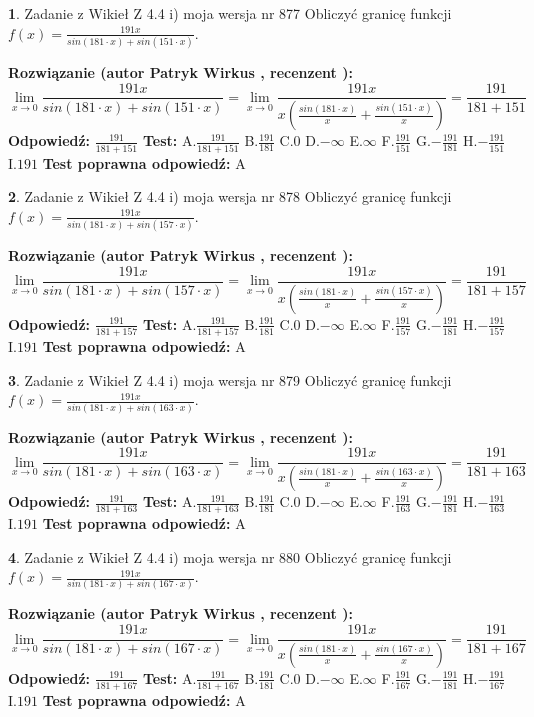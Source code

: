 \documentclass[12pt, a4paper]{article}
\theoremstyle{definition} %
\newtheorem{zad}{}
\newcommand{\zadStart}[1]{\begin{zad}#1\newline}
\newcommand{\zadStop}{\end{zad}}
\newcommand{\rozwStart}[2]{\noindent \textbf{Rozwiązanie (autor #1 , recenzent #2): }\newline}
\newcommand{\rozwStop}{\newline}
\newcommand{\odpStart}{\noindent \textbf{Odpowiedź:}\newline}
\newcommand{\odpStop}{\newline}
\newcommand{\testStart}{\noindent \textbf{Test:}\newline}
\newcommand{\testStop}{\newline}
\newcommand{\kluczStart}{\noindent \textbf{Test poprawna odpowiedź:}\newline}
\newcommand{\kluczStop}{\newline}
\begin{document}
\zadStart{Zadanie z Wikieł Z 4.4 i) moja wersja nr 877}
Obliczyć granicę funkcji $f(x)=\frac{191x}{sin(181\cdot x) +sin(151\cdot x)}$.
\zadStop
\rozwStart{Patryk Wirkus}{}
$$\lim\limits_{x\to 0}\frac{191x}{sin(181\cdot x) +sin(151\cdot x)}=\lim\limits_{x\to 0}\frac{191x}{x(\frac{sin(181\cdot x)}{x}+\frac{sin(151\cdot x)}{x})}=\frac{191}{181+151}$$
\rozwStop
\odpStart
$\frac{191}{181+151}$
\odpStop
\testStart
A.$\frac{191}{181+151}$
B.$\frac{191}{181}$
C.$0$
D.$-\infty$
E.$\infty$
F.$\frac{191}{151}$
G.$-\frac{191}{181}$
H.$-\frac{191}{151}$
I.$191$
\testStop
\kluczStart
A
\kluczStop



\zadStart{Zadanie z Wikieł Z 4.4 i) moja wersja nr 878}
Obliczyć granicę funkcji $f(x)=\frac{191x}{sin(181\cdot x) +sin(157\cdot x)}$.
\zadStop
\rozwStart{Patryk Wirkus}{}
$$\lim\limits_{x\to 0}\frac{191x}{sin(181\cdot x) +sin(157\cdot x)}=\lim\limits_{x\to 0}\frac{191x}{x(\frac{sin(181\cdot x)}{x}+\frac{sin(157\cdot x)}{x})}=\frac{191}{181+157}$$
\rozwStop
\odpStart
$\frac{191}{181+157}$
\odpStop
\testStart
A.$\frac{191}{181+157}$
B.$\frac{191}{181}$
C.$0$
D.$-\infty$
E.$\infty$
F.$\frac{191}{157}$
G.$-\frac{191}{181}$
H.$-\frac{191}{157}$
I.$191$
\testStop
\kluczStart
A
\kluczStop



\zadStart{Zadanie z Wikieł Z 4.4 i) moja wersja nr 879}
Obliczyć granicę funkcji $f(x)=\frac{191x}{sin(181\cdot x) +sin(163\cdot x)}$.
\zadStop
\rozwStart{Patryk Wirkus}{}
$$\lim\limits_{x\to 0}\frac{191x}{sin(181\cdot x) +sin(163\cdot x)}=\lim\limits_{x\to 0}\frac{191x}{x(\frac{sin(181\cdot x)}{x}+\frac{sin(163\cdot x)}{x})}=\frac{191}{181+163}$$
\rozwStop
\odpStart
$\frac{191}{181+163}$
\odpStop
\testStart
A.$\frac{191}{181+163}$
B.$\frac{191}{181}$
C.$0$
D.$-\infty$
E.$\infty$
F.$\frac{191}{163}$
G.$-\frac{191}{181}$
H.$-\frac{191}{163}$
I.$191$
\testStop
\kluczStart
A
\kluczStop



\zadStart{Zadanie z Wikieł Z 4.4 i) moja wersja nr 880}
Obliczyć granicę funkcji $f(x)=\frac{191x}{sin(181\cdot x) +sin(167\cdot x)}$.
\zadStop
\rozwStart{Patryk Wirkus}{}
$$\lim\limits_{x\to 0}\frac{191x}{sin(181\cdot x) +sin(167\cdot x)}=\lim\limits_{x\to 0}\frac{191x}{x(\frac{sin(181\cdot x)}{x}+\frac{sin(167\cdot x)}{x})}=\frac{191}{181+167}$$
\rozwStop
\odpStart
$\frac{191}{181+167}$
\odpStop
\testStart
A.$\frac{191}{181+167}$
B.$\frac{191}{181}$
C.$0$
D.$-\infty$
E.$\infty$
F.$\frac{191}{167}$
G.$-\frac{191}{181}$
H.$-\frac{191}{167}$
I.$191$
\testStop
\kluczStart
A
\kluczStop
\end{document}
